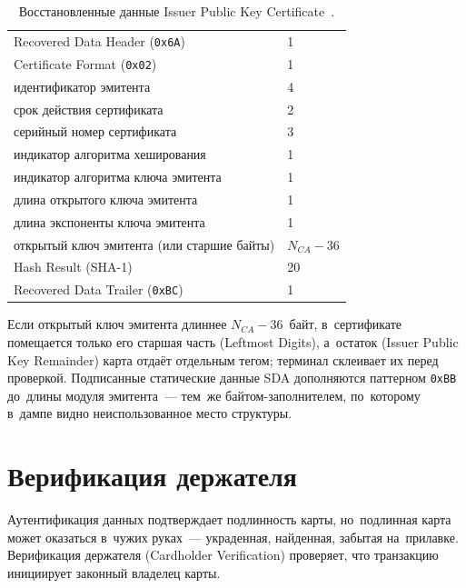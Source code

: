 \begin{table}[t]
  \caption{Восстановленные данные Issuer Public Key Certificate~\cite{emvco-book2}.}\label{tab:emv-cert}
  \begingroup
  \tablesetup
  \begin{tabularx}{0.62\textwidth}{@{}Y P{6.2em}@{}}
    \toprule
    \headrow
     &  \\
    \midrule
    Recovered Data Header (\texttt{0x6A}) & 1 \\
    \rowsep
    Certificate Format (\texttt{0x02}) & 1 \\
    \rowsep
    идентификатор эмитента & 4 \\
    \rowsep
    срок действия сертификата & 2 \\
    \rowsep
    серийный номер сертификата & 3 \\
    \rowsep
    индикатор алгоритма хеширования & 1 \\
    \rowsep
    индикатор алгоритма ключа эмитента & 1 \\
    \rowsep
    длина открытого ключа эмитента & 1 \\
    \rowsep
    длина экспоненты ключа эмитента & 1 \\
    \rowsep
    открытый ключ эмитента (или старшие байты) & $N_{CA}-36$ \\
    \rowsep
    Hash Result (SHA-1) & 20 \\
    \rowsep
    Recovered Data Trailer (\texttt{0xBC}) & 1 \\
    \bottomrule
  \end{tabularx}\par
  \endgroup
\end{table}

Если открытый ключ эмитента длиннее $N_{CA}-36$~байт, в~сертификате помещается только его
старшая часть (Leftmost Digits), а~остаток (Issuer Public Key Remainder) карта
отдаёт отдельным тегом; терминал склеивает их перед проверкой. Подписанные
статические данные SDA дополняются паттерном \texttt{0xBB} до~длины модуля
эмитента~--- тем~же байтом-заполнителем, по~которому в~дампе видно неиспользованное
место структуры.

\section{Верификация держателя}\label{sec:emv-cvm}

Аутентификация данных подтверждает подлинность карты, но~подлинная карта может
оказаться в~чужих руках~--- украденная, найденная, забытая на~прилавке.
Верификация держателя (Cardholder Verification) проверяет, что транзакцию
инициирует законный владелец карты.

